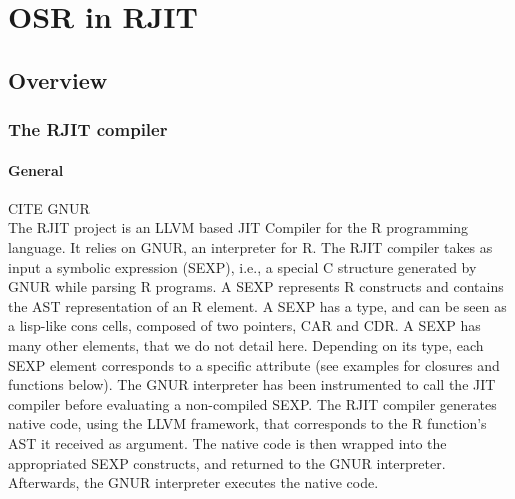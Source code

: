 
\chapter{OSR in RJIT} %

\label{Chapter4New} %


\newcommand{\keyword}[1]{\textbf{#1}}
\newcommand{\tabhead}[1]{\textbf{#1}}
\newcommand{\code}[1]{\texttt{#1}}
\newcommand{\file}[1]{\texttt{\bfseries#1}}
\newcommand{\option}[1]{\texttt{\itshape#1}}

\section{Overview}
\subsection{The RJIT compiler}
\subsubsection{General}
CITE GNUR\\
The RJIT project is an LLVM based JIT Compiler for the R programming language.
It relies on GNUR, an interpreter for R. 
The RJIT compiler takes as input a symbolic expression (SEXP), i.e., a special C structure generated by GNUR while parsing R programs.
A SEXP represents R constructs and contains the AST representation of an R element.
A SEXP has a type, and can be seen as a lisp-like cons cells, composed of two pointers, CAR and CDR.
A SEXP has many other elements, that we do not detail here.
Depending on its type, each SEXP element corresponds to a specific attribute (see examples for closures and functions below). 
The GNUR interpreter has been instrumented to call the JIT compiler before evaluating a non-compiled SEXP. 
The RJIT compiler generates native code, using the LLVM framework, that corresponds to the R function's AST it received as argument.
The native code is then wrapped into the appropriated SEXP constructs, and returned to the GNUR interpreter.
Afterwards, the GNUR interpreter executes the native code.\\ 

